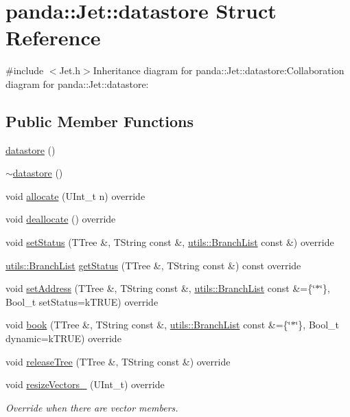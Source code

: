 \hypertarget{structpanda_1_1Jet_1_1datastore}{
\section{panda::Jet::datastore Struct Reference}
\label{structpanda_1_1Jet_1_1datastore}
}


{\ttfamily \#include $<$Jet.h$>$}Inheritance diagram for panda::Jet::datastore:Collaboration diagram for panda::Jet::datastore:\subsection*{Public Member Functions}
\begin{DoxyCompactItemize}
\item 
\hyperlink{structpanda_1_1Jet_1_1datastore_ae927a2e58d5ac6418b839d01dac0bd37}{datastore} ()
\item 
\hyperlink{structpanda_1_1Jet_1_1datastore_a70fb643b535f39f676287fe34d603e01}{$\sim$datastore} ()
\item 
void \hyperlink{structpanda_1_1Jet_1_1datastore_a899f59963d18c2c13019d9ed27eb7745}{allocate} (UInt\_\-t n) override
\item 
void \hyperlink{structpanda_1_1Jet_1_1datastore_a606415eee51c1a38fc0613f3b2946d1e}{deallocate} () override
\item 
void \hyperlink{structpanda_1_1Jet_1_1datastore_ae5a3ebcab7eefec1efc08e4f714ce2ad}{setStatus} (TTree \&, TString const \&, \hyperlink{classpanda_1_1utils_1_1BranchList}{utils::BranchList} const \&) override
\item 
\hyperlink{classpanda_1_1utils_1_1BranchList}{utils::BranchList} \hyperlink{structpanda_1_1Jet_1_1datastore_ac3a9ecd013ec5d5bf94f71ff013e5491}{getStatus} (TTree \&, TString const \&) const override
\item 
void \hyperlink{structpanda_1_1Jet_1_1datastore_aba38557e272994b9913ffbe323892d7d}{setAddress} (TTree \&, TString const \&, \hyperlink{classpanda_1_1utils_1_1BranchList}{utils::BranchList} const \&=\{\char`\"{}$\ast$\char`\"{}\}, Bool\_\-t setStatus=kTRUE) override
\item 
void \hyperlink{structpanda_1_1Jet_1_1datastore_a6b3a8bbeb4fa9c002c5eebbd97962095}{book} (TTree \&, TString const \&, \hyperlink{classpanda_1_1utils_1_1BranchList}{utils::BranchList} const \&=\{\char`\"{}$\ast$\char`\"{}\}, Bool\_\-t dynamic=kTRUE) override
\item 
void \hyperlink{structpanda_1_1Jet_1_1datastore_ae6ac289071c894912c7a60cdd224509f}{releaseTree} (TTree \&, TString const \&) override
\item 
void \hyperlink{structpanda_1_1Jet_1_1datastore_a8de9fbcd55c17f7d3d022088f6ded487}{resizeVectors\_\-} (UInt\_\-t) override
\begin{DoxyCompactList}\small\item\em Override when there are vector members. \item\end{DoxyCompactList}\end{DoxyCompactItemize}


